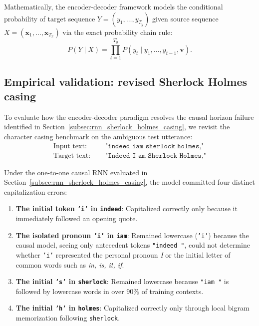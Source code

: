 \documentclass[../../main.tex]{subfiles}
\begin{document}
Mathematically, the encoder-decoder framework models the conditional probability of target sequence $Y = (y_1, \dots, y_{T_y})$ given source sequence $X = (\mathbf{x}_1, \dots, \mathbf{x}_{T_x})$ via the exact probability chain rule:
\begin{equation}
P(Y \mid X) = \prod_{t=1}^{T_y} P\left(y_t \mid y_1, \dots, y_{t-1}, \mathbf{v}\right).
\label{eq:seq2seq_probability_factorization}
\end{equation}

\subsection{Empirical validation: revised Sherlock Holmes casing}
\label{subsec:rnn_seq2seq_casing_validation}

To evaluate how the encoder-decoder paradigm resolves the causal horizon failure identified in Section~\ref{subsec:rnn_sherlock_holmes_casing}, we revisit the character casing benchmark on the ambiguous test utterance:
\begin{align}
\text{Input text: } & \quad \texttt{"indeed iam sherlock holmes,"} \\
\text{Target text: } & \quad \texttt{"Indeed I am Sherlock Holmes,"}
\end{align}

Under the one-to-one causal RNN evaluated in Section~\ref{subsec:rnn_sherlock_holmes_casing}, the model committed four distinct capitalization errors:
\begin{enumerate}
    \item \textbf{The initial token \texttt{'i'} in \texttt{indeed}}: Capitalized correctly only because it immediately followed an opening quote.
    \item \textbf{The isolated pronoun \texttt{'i'} in \texttt{iam}}: Remained lowercase (\texttt{'i'}) because the causal model, seeing only antecedent tokens \texttt{"indeed "}, could not determine whether \texttt{'i'} represented the personal pronoun \textit{I} or the initial letter of common words such as \textit{in, is, it, if}.
    \item \textbf{The initial \texttt{'s'} in \texttt{sherlock}}: Remained lowercase because \texttt{"iam "} is followed by lowercase words in over $90\%$ of training contexts.
    \item \textbf{The initial \texttt{'h'} in \texttt{holmes}}: Capitalized correctly only through local bigram memorization following \texttt{sherlock}.
\end{enumerate}
\end{document}
